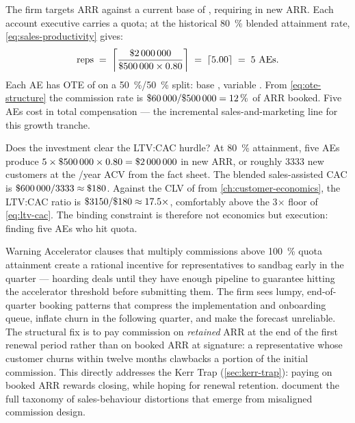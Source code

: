 \begin{example}
The firm targets  ARR against a current base of , requiring
 in new ARR. Each account executive carries a  quota; at the
historical \qty{80}{\percent} blended attainment rate, \cref{eq:sales-productivity} gives:
\[
  \text{reps} \;=\;
    \left\lceil\frac{\$\num{2000000}}{\$\num{500000}\times0.80}\right\rceil
    \;=\; \lceil 5.00 \rceil \;=\; 5\ \text{AEs}.
\]
Each AE has OTE of  on a \qty{50}{\percent}/\qty{50}{\percent} split: base
, variable . From \cref{eq:ote-structure} the commission rate is
\(\$\num{60000}/\$\num{500000} = \qty{12}{\percent}\) of ARR booked. Five AEs cost
 in total compensation --- the incremental sales-and-marketing line for this
growth tranche.

Does the investment clear the LTV:CAC hurdle? At \qty{80}{\percent} attainment, five AEs
produce \(5\times\$\num{500000}\times0.80=\$\num{2000000}\) in new ARR, or roughly
\num{3333} new customers at the /year ACV from the fact sheet. The blended
sales-assisted CAC is \(\$\num{600000}/\num{3333}\approx\$\num{180}\). Against the CLV of
 from \cref{ch:customer-economics}, the LTV:CAC ratio is
\(\$\num{3150}/\$\num{180}\approx17.5\times\), comfortably above the 3\(\times\) floor of
\cref{eq:ltv-cac}. The binding constraint is therefore not economics but execution:
finding five AEs who hit quota.
\end{example}

\begin{admonition}{Warning}
Accelerator clauses that multiply commissions above \qty{100}{\percent} quota attainment
create a rational incentive for representatives to sandbag early in the quarter --- hoarding
deals until they have enough pipeline to guarantee hitting the accelerator threshold before
submitting them. The firm sees lumpy, end-of-quarter booking patterns that compress the
implementation and onboarding queue, inflate churn in the following quarter, and make the
forecast unreliable. The structural fix is to pay commission on \textit{retained} ARR at the
end of the first renewal period rather than on booked ARR at signature: a representative
whose customer churns within twelve months clawbacks a portion of the initial commission.
This directly addresses the Kerr Trap (\cref{sec:kerr-trap}): paying on booked ARR rewards
closing, while hoping for renewal retention. \textcite{dixon2011challenger} document
the full taxonomy of sales-behaviour distortions that emerge from misaligned commission design.
\end{admonition}

